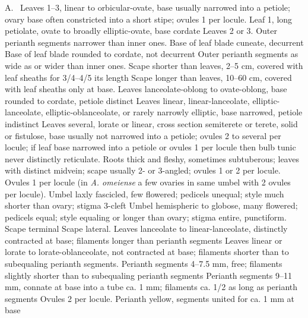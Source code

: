\documentclass{ctexart}
\begin{document}
\begin{Key*}{A.~}
\alter Leaves 1--3, linear to orbicular-ovate, base usually narrowed into a petiole; ovary base often constricted into a short stipe; ovules 1 per locule.
\alter Leaf 1, long petiolate, ovate to broadly elliptic-ovate, base cordate
\alter Leaves 2 or 3.
\alter Outer perianth segments narrower than inner ones.
\alter Base of leaf blade cuneate, decurrent
\alter Base of leaf blade rounded to cordate, not decurrent
\alter Outer perianth segments as wide as or wider than inner ones.
\alter Scape shorter than leaves, 2--5 cm, covered with leaf sheaths for 3/4--4/5 its length
\alter Scape longer than leaves, 10--60 cm, covered with leaf sheaths only at base.
\alter Leaves lanceolate-oblong to ovate-oblong, base rounded to cordate, petiole distinct
\alter Leaves linear, linear-lanceolate, elliptic-lanceolate, elliptic-oblanceolate, or rarely narrowly elliptic, base narrowed, petiole indistinct
\alter Leaves several, lorate or linear, cross section semiterete or terete, solid or fistulose, base usually not narrowed into a petiole; ovules 2 to several per locule; if leaf base narrowed into a petiole or ovules 1 per locule then bulb tunic never distinctly reticulate.
\alter Roots thick and fleshy, sometimes subtuberous; leaves with distinct midvein; scape usually 2- or 3-angled; ovules 1 or 2 per locule.
\alter Ovules 1 per locule (in \textit{A. omeiense} a few ovaries in same umbel with 2 ovules per locule).
\alter Umbel laxly fascicled, few flowered; pedicels unequal; style much shorter than ovary; stigma 3-cleft
\alter Umbel hemispheric to globose, many flowered; pedicels equal; style equaling or longer than ovary; stigma entire, punctiform.
\alter Scape terminal
\alter Scape lateral.
\alter Leaves lanceolate to linear-lanceolate, distinctly contracted at base; filaments longer than perianth segments
\alter Leaves linear or lorate to lorate-oblanceolate, not contracted at base; filaments shorter than to subequaling perianth segments.
\alter Perianth segments 4--7.5 mm, free; filaments slightly shorter than to subequaling perianth segments
\alter Perianth segments 9--11 mm, connate at base into a tube ca. 1 mm; filaments ca. 1/2 as long as perianth segments
\alter Ovules 2 per locule.
\alter Perianth yellow, segments united for ca. 1 mm at base

\end{Key*}
\end{document}
